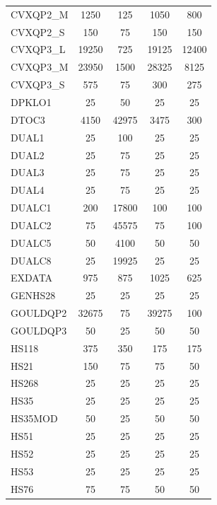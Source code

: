 \begin{longtable}{lcccc}
CVXQP2\_M &     1250 &   125 &     1050 &      800 \\
CVXQP2\_S &      150 &    75 &      150 &      150 \\
CVXQP3\_L &    19250 &   725 &    19125 &    12400 \\
CVXQP3\_M &    23950 &  1500 &    28325 &     8125 \\
CVXQP3\_S &      575 &    75 &      300 &      275 \\
DPKLO1   &       25 &    50 &       25 &       25 \\
DTOC3    &     4150 & 42975 &     3475 &      300 \\
DUAL1    &       25 &   100 &       25 &       25 \\
DUAL2    &       25 &    75 &       25 &       25 \\
DUAL3    &       25 &    75 &       25 &       25 \\
DUAL4    &       25 &    75 &       25 &       25 \\
DUALC1   &      200 & 17800 &      100 &      100 \\
DUALC2   &       75 & 45575 &       75 &      100 \\
DUALC5   &       50 &  4100 &       50 &       50 \\
DUALC8   &       25 & 19925 &       25 &       25 \\
EXDATA   &      975 &   875 &     1025 &      625 \\
GENHS28  &       25 &    25 &       25 &       25 \\
GOULDQP2 &    32675 &    75 &    39275 &      100 \\
GOULDQP3 &       50 &    25 &       50 &       50 \\
HS118    &      375 &   350 &      175 &      175 \\
HS21     &      150 &    75 &       75 &       50 \\
HS268    &       25 &    25 &       25 &       25 \\
HS35     &       25 &    25 &       25 &       25 \\
HS35MOD  &       50 &    25 &       50 &       50 \\
HS51     &       25 &    25 &       25 &       25 \\
HS52     &       25 &    25 &       25 &       25 \\
HS53     &       25 &    25 &       25 &       25 \\
HS76     &       75 &    75 &       50 &       50 \\

\end{longtable}
